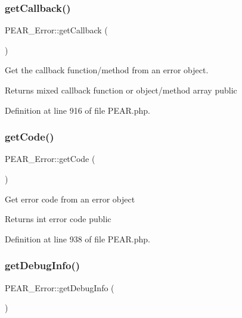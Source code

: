 \subsubsection{\texorpdfstring{get\+Callback()}{getCallback()}}
{\footnotesize\ttfamily P\+E\+A\+R\+\_\+\+Error\+::get\+Callback (\begin{DoxyParamCaption}{ }\end{DoxyParamCaption})}

Get the callback function/method from an error object.

\begin{DoxyReturn}{Returns}
mixed callback function or object/method array  public 
\end{DoxyReturn}


Definition at line 916 of file P\+E\+A\+R.\+php.

\hypertarget{classPEAR__Error_a54924b41ab0d14ed7007f3c1b3f0ca82}{}\label{classPEAR__Error_a54924b41ab0d14ed7007f3c1b3f0ca82} 
\subsubsection{\texorpdfstring{get\+Code()}{getCode()}}
{\footnotesize\ttfamily P\+E\+A\+R\+\_\+\+Error\+::get\+Code (\begin{DoxyParamCaption}{ }\end{DoxyParamCaption})}

Get error code from an error object

\begin{DoxyReturn}{Returns}
int error code  public 
\end{DoxyReturn}


Definition at line 938 of file P\+E\+A\+R.\+php.

\hypertarget{classPEAR__Error_a33eade09a689fdb4e5a79727fa407f13}{}\label{classPEAR__Error_a33eade09a689fdb4e5a79727fa407f13} 
\subsubsection{\texorpdfstring{get\+Debug\+Info()}{getDebugInfo()}}
{\footnotesize\ttfamily P\+E\+A\+R\+\_\+\+Error\+::get\+Debug\+Info (\begin{DoxyParamCaption}{ }\end{DoxyParamCaption})}

